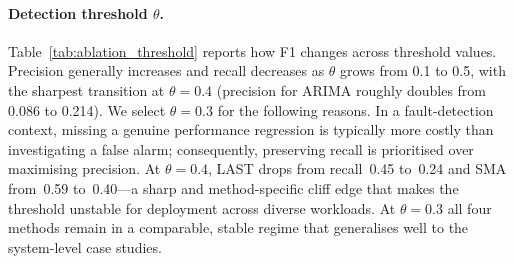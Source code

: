 \documentclass[pdflatex,sn-nature]{sn-jnl}%
\theoremstyle{thmstyleone}%
\theoremstyle{thmstyletwo}%
\theoremstyle{thmstylethree}%
\begin{document}
\begin{table}[tbp]
\centering
{}
\caption{Ablation on smoothing factor $\beta$ (P = mean precision, F1 = mean F1 score; $\tau{=}5$, $\theta{=}0.3$).}
\label{tab:ablation_beta}
\end{table}

\paragraph{Detection threshold $\theta$.}
Table~\ref{tab:ablation_threshold} reports how F1 changes across threshold values. Precision generally increases and recall decreases as $\theta$ grows from 0.1 to 0.5, with the sharpest transition at $\theta{=}0.4$ (precision for ARIMA roughly doubles from 0.086 to 0.214). We select $\theta{=}0.3$ for the following reasons. In a fault-detection context, missing a genuine performance regression is typically more costly than investigating a false alarm; consequently, preserving recall is prioritised over maximising precision. At $\theta{=}0.4$, LAST drops from recall~0.45 to~0.24 and SMA from~0.59 to~0.40---a sharp and method-specific cliff edge that makes the threshold unstable for deployment across diverse workloads. At $\theta{=}0.3$ all four methods remain in a comparable, stable regime that generalises well to the system-level case studies.
\end{document}
